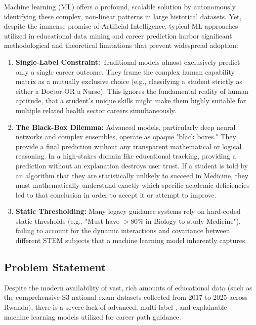 Machine learning (ML) offers a profound, scalable solution by autonomously identifying these complex, non-linear patterns in large historical datasets. Yet, despite the immense promise of Artificial Intelligence, typical ML approaches utilized in educational data mining and career prediction harbor significant methodological and theoretical limitations that prevent widespread adoption:

\begin{enumerate}
    \item \textbf{Single-Label Constraint:} Traditional models almost exclusively predict only a single career outcome. They frame the complex human capability matrix as a mutually exclusive choice (e.g., classifying a student strictly as either a Doctor OR a Nurse). This ignores the fundamental reality of human aptitude, that a student's unique skills might make them highly suitable for multiple related health sector careers simultaneously.
    \item \textbf{The Black-Box Dilemma:} Advanced models, particularly deep neural networks and complex ensembles, operate as opaque "black boxes." They provide a final prediction without any transparent mathematical or logical reasoning. In a high-stakes domain like educational tracking, providing a prediction without an explanation destroys user trust. If a student is told by an algorithm that they are statistically unlikely to succeed in Medicine, they must mathematically understand exactly which specific academic deficiencies led to that conclusion in order to accept it or attempt to improve.
    \item \textbf{Static Thresholding:} Many legacy guidance systems rely on hard-coded static thresholds (e.g., "Must have $>80\%$ in Biology to study Medicine"), failing to account for the dynamic interactions and covariance between different STEM subjects that a machine learning model inherently captures.
\end{enumerate}

\subsection{Problem Statement}

Despite the modern availability of vast, rich amounts of educational data (such as the comprehensive S3 national exam datasets collected from 2017 to 2025 across Rwanda), there is a severe lack of advanced, multi-label \parencite{tsoumakas2007multi}, and explainable machine learning models utilized for career path guidance. 

